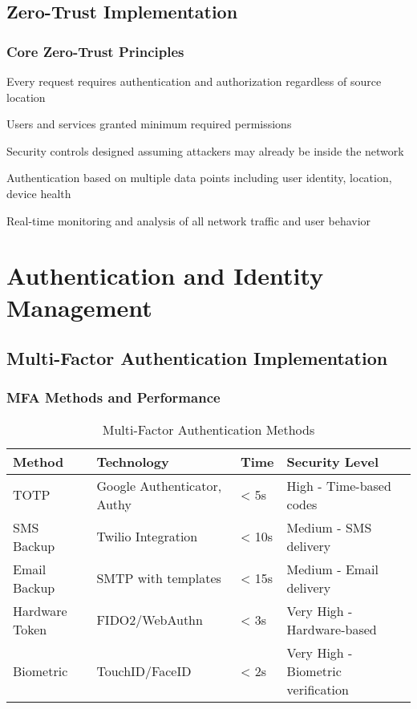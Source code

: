 \subsection{Zero-Trust Implementation}

\subsubsection{Core Zero-Trust Principles}

\begin{description}[leftmargin=*]
    \item[Never Trust, Always Verify] Every request requires authentication and authorization regardless of source location
    \item[Least Privilege Access] Users and services granted minimum required permissions
    \item[Assume Breach] Security controls designed assuming attackers may already be inside the network
    \item[Verify Explicitly] Authentication based on multiple data points including user identity, location, device health
    \item[Continuous Monitoring] Real-time monitoring and analysis of all network traffic and user behavior
\end{description}

\section{Authentication and Identity Management}

\subsection{Multi-Factor Authentication Implementation}

\subsubsection{MFA Methods and Performance}

\begin{table}[H]
\centering
\caption{Multi-Factor Authentication Methods}
\begin{tabular}{|p{3cm}|p{3cm}|p{2cm}|p{4cm}|}
\hline
\textbf{Method} & \textbf{Technology} & \textbf{Time} & \textbf{Security Level} \\
\hline
TOTP & Google Authenticator, Authy & < 5s & High - Time-based codes \\
\hline
SMS Backup & Twilio Integration & < 10s & Medium - SMS delivery \\
\hline
Email Backup & SMTP with templates & < 15s & Medium - Email delivery \\
\hline
Hardware Token & FIDO2/WebAuthn & < 3s & Very High - Hardware-based \\
\hline
Biometric & TouchID/FaceID & < 2s & Very High - Biometric verification \\
\hline
\end{tabular}
\end{table}

